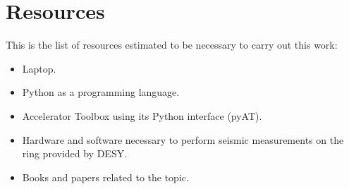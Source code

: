 \documentclass[12pt]{article}
\begin{document}
\section{Resources}
This is the list of resources estimated to be necessary to carry out this work:
\begin{itemize}
    \item Laptop.
    \item Python as a programming language.
    \item Accelerator Toolbox using its Python interface (pyAT).
    \item Hardware and software necessary to perform seismic measurements on the ring provided by DESY.
    \item Books and papers related to the topic.
\end{itemize}

\pagebreak



\end{document}
